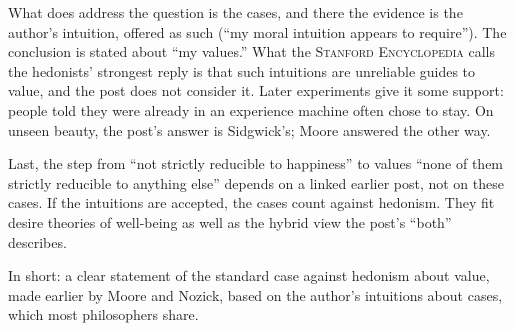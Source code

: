 \begin{afterword}
What does address the question is the cases, and there the evidence is the author's intuition, offered as such (``my moral intuition appears to require''). The conclusion is stated about ``my values.'' What the \textsc{Stanford Encyclopedia} calls the hedonists' strongest reply is that such intuitions are unreliable guides to value, and the post does not consider it. Later experiments give it some support: people told they were already in an experience machine often chose to stay. On unseen beauty, the post's answer is Sidgwick's; Moore answered the other way.

Last, the step from ``not strictly reducible to happiness'' to values ``none of them strictly reducible to anything else'' depends on a linked earlier post, not on these cases. If the intuitions are accepted, the cases count against hedonism. They fit desire theories of well-being as well as the hybrid view the post's ``both'' describes.

In short: a clear statement of the standard case against hedonism about value, made earlier by Moore and Nozick, based on the author's intuitions about cases, which most philosophers share.
\end{afterword}
